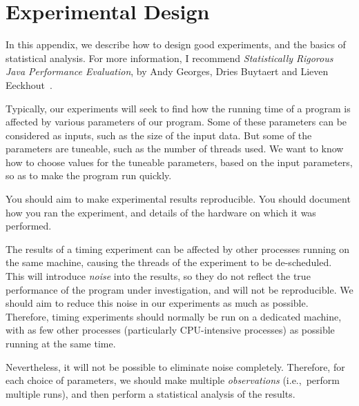 \chapter{Experimental Design}
\label{app:experiments}

In this appendix, we describe how to design good experiments, and the basics
of statistical analysis.  For more information, I recommend
\emph{Statistically Rigorous Java Performance Evaluation}, by Andy Georges,
Dries Buytaert and Lieven Eeckhout~\cite{Georges+}.

Typically, our experiments will seek to find how the running time of a program
is affected by various parameters of our program.  Some of these parameters
can be considered as inputs, such as the size of the input data.  But some of
the parameters are tuneable, such as the number of threads used.  We want to
know how to choose values for the tuneable parameters, based on the input
parameters, so as to make the program run quickly. 


You should aim to make experimental results reproducible.  You should document
how you ran the experiment, and details of the hardware on which it was
performed.

The results of a timing experiment can be affected by other processes
running on the same machine, causing the threads of the experiment to be
de-scheduled.  This will introduce \emph{noise} into the results, so they do
not reflect the true performance of the program under investigation, and will
not be reproducible.
%
We should aim to reduce this noise in our experiments as much as possible.
Therefore, timing experiments should normally be run on a dedicated machine,
with as few other processes (particularly CPU-intensive processes) as possible
running at the same time.

Nevertheless, it will not be possible to eliminate noise completely.
Therefore, for each choice of parameters, we should make multiple
\emph{observations} (i.e.,~perform multiple runs), and then perform a
statistical analysis of the results.

